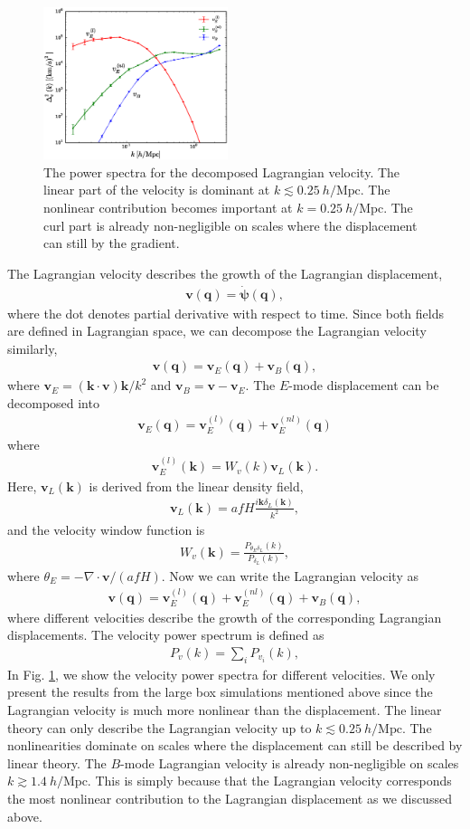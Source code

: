 \documentclass[aps,prd,twocolumn,superscriptaddress,groupedaddress,nofootinbib,amsfont]{revtex4}  %
\newcommand{\mr}{\mathrm}
\newcommand{\bea}{\begin{eqnarray}}
\newcommand{\eea}{\end{eqnarray}}
\newcommand{\bmp}{\bm{\psi}}
\newcommand{\bmv}{\bm{v}}
\newcommand{\bmk}{\bm{k}}
\newcommand{\bmq}{\bm{q}}
\begin{document}
\begin{figure}[tbp]
\begin{center}
\includegraphics[width=0.48\textwidth]{f5.eps}
\end{center}
\vspace{-0.7cm}
\caption{The power spectra for the decomposed Lagrangian velocity. The linear
    part of the velocity is dominant at $k\lesssim0.25\ h/\mr{Mpc}$. 
    The nonlinear contribution becomes important at $k=0.25\ h/\mr{Mpc}$. 
    The curl part is already non-negligible on scales where the displacement 
    can still by the gradient.}
\label{fig:pk_vel}
\end{figure}

The Lagrangian velocity describes the growth of the Lagrangian displacement,
\bea
\bmv(\bmq)=\dot{\bmp}(\bmq),
\eea
where the dot denotes partial derivative with respect to time.
Since both fields are defined in Lagrangian space, we can decompose the 
Lagrangian velocity similarly,
\bea
\bmv(\bmq)=\bmv_E(\bmq)+\bmv_B(\bmq),
\eea
where $\bmv_E=(\bmk\cdot\bmv)\bmk/k^2$ and $\bmv_B=\bmv-\bmv_E$. 
The $E$-mode displacement can be decomposed into
\bea
\bmv_E(\bmq)=\bmv_E^{(l)}(\bmq)+\bmv_E^{(nl)}(\bmq)
\eea
where 
\bea
\bmv_E^{(l)}(\bmk)=W_v(k)\bmv_L(\bmk).
\eea
Here, $\bmv_L(\bmk)$ is derived from the linear density field,
\bea
\bmv_L(\bmk)=afH\frac{i\bmk\delta_L(\bmk)}{k^2},
\eea
and the velocity window function is 
\bea
W_v(\bmk)=\frac{P_{\theta_E\delta_L}(k)}{P_{\delta_L}(k)},
\eea
where $\theta_E=-\nabla\cdot\bmv/(afH)$. 
Now we can write the Lagrangian velocity as
\bea
\bmv(\bmq)=\bmv_E^{(l)}(\bmq)+\bmv_E^{(nl)}(\bmq)+\bmv_B(\bmq),
\eea
where different velocities describe the growth of the corresponding Lagrangian displacements.
The velocity power spectrum is defined as
\bea
P_v(k)=\sum_iP_{v_i}(k),
\eea
In Fig. \ref{fig:pk_vel}, we show the velocity power spectra for different velocities. We only present the results from the large box simulations mentioned above since the Lagrangian velocity is much more nonlinear than the displacement.
The linear theory can only describe the Lagrangian velocity up to $k\lesssim0.25\ h/\mr{Mpc}$. The nonlinearities dominate on scales where the displacement can 
still be described by linear theory. The $B$-mode Lagrangian velocity is already
non-negligible on scales $k\gtrsim1.4\ h/\mr{Mpc}$. 
This is simply because that the Lagrangian velocity corresponds the most 
nonlinear contribution to the Lagrangian displacement as we discussed above. 
\end{document}
